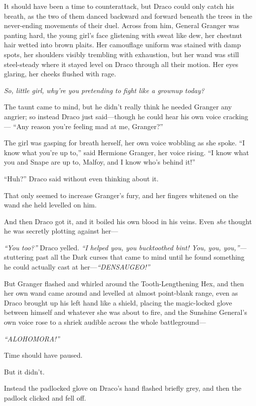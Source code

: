 It should have been a time to counterattack, but Draco could only catch
his breath, as the two of them danced backward and forward beneath the
trees in the never-ending movements of their duel. Across from him,
General Granger was panting hard, the young girl's face glistening with
sweat like dew, her chestnut hair wetted into brown plaits. Her
camouflage uniform was stained with damp spots, her shoulders visibly
trembling with exhaustion, but her wand was still steel-steady where it
stayed level on Draco through all their motion. Her eyes glaring, her
cheeks flushed with rage.

\emph{So, little girl, why're you pretending to fight like a grownup
today?}

The taunt came to mind, but he didn't really think he needed Granger any
angrier; so instead Draco just said---though he could hear his own voice
cracking--- ``Any reason you're feeling mad at me, Granger?''

The girl was gasping for breath herself, her own voice wobbling as she
spoke. ``I know what you're up to,'' said Hermione Granger, her voice
rising. ``I know what you and Snape are up to, Malfoy, and I know who's
behind it!''

``Huh?'' Draco said without even thinking about it.

That only seemed to increase Granger's fury, and her fingers whitened on
the wand she held levelled on him.

And then Draco got it, and it boiled his own blood in his veins. Even
\emph{she} thought he was secretly plotting against her---

\emph{``You too?''} Draco yelled. \emph{``I helped you, you bucktoothed
bint! You, you, you,''---} stuttering past all the Dark curses that came
to mind until he found something he could actually cast at
her---\emph{``DENSAUGEO!''}

But Granger flashed and whirled around the Tooth-Lengthening Hex, and
then her own wand came around and levelled at almost point-blank range,
even as Draco brought up his left hand like a shield, placing the
magic-locked glove between himself and whatever she was about to fire,
and the Sunshine General's own voice rose to a shriek audible across the
whole battleground---

\emph{``ALOHOMORA!''}

Time should have paused.

But it didn't.

Instead the padlocked glove on Draco's hand flashed briefly grey, and
then the padlock clicked and fell off.

